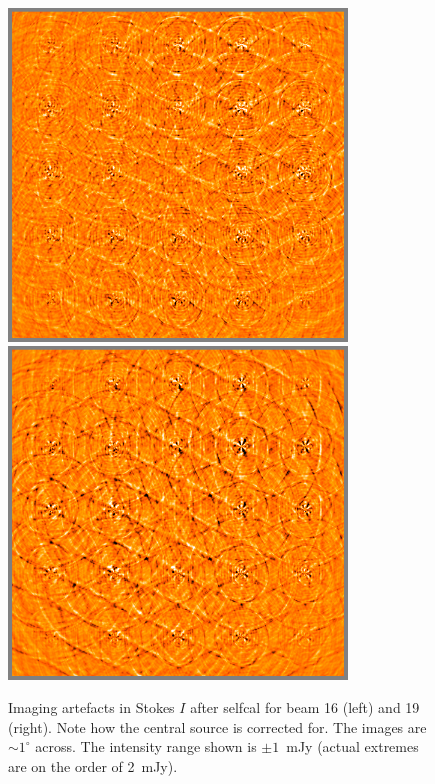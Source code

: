 \documentclass[10pt]{article}
\begin{document}
\begin{figure}
\includegraphics[width=9cm]{diff15cal}%
\includegraphics[width=9cm]{diff18cal}%
\caption{\label{fig:diff-cal}Imaging artefacts in Stokes $I$ after selfcal for beam 16 (left) and 19 (right). Note how the central source is corrected for. The images are $\sim1^\circ$ across. The intensity range shown is $\pm1$~mJy (actual extremes are on the order of 2~mJy).}
\end{figure}
\end{document}
